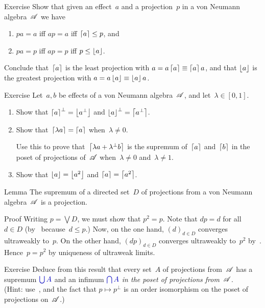 \documentclass[a]{subfiles}
\begin{document}
\begin{parsec}
\begin{point}{Exercise}%
Show that given an effect~$a$ and a projection~$p$
in a von Neumann algebra~$\mathscr{A}$ we have
\begin{enumerate}
\item
$pa=a$ iff $ap=a$ iff $\left\lceil a\right\rceil\leq p$, and
\item
$pa=p$ iff $ap=p$ iff $p\leq \left\lfloor a\right\rfloor$.
\end{enumerate}
Conclude that~$\left\lceil a\right\rceil$
is the least projection with $a=a\left\lceil a\right\rceil\equiv\left\lceil a\right\rceil a$,
and that $\left\lfloor a\right\rfloor$
is the greatest projection with $a=a\left\lfloor a\right\rfloor\equiv \left\lfloor a\right\rfloor a$.
\end{point}
\begin{point}{Exercise}%
Let~$a,b$ be effects of a von Neumann algebra~$\mathscr{A}$,
and let~$\lambda\in [0,1]$.
\begin{enumerate}
\item
Show that $\left\lceil a\right\rceil^\perp = \left\lfloor a^\perp\right\rfloor$
and $\left\lfloor a\right\rfloor^\perp = \left\lceil a^\perp\right\rceil$.
\item
Show that~$\left\lceil\lambda a\right\rceil = \left\lceil a\right\rceil$
when~$\lambda\neq 0$.

Use this to prove that~$\left\lceil\lambda a+\lambda^\perp b\right\rceil$
is the supremum of~$\left\lceil a\right\rceil$ and~$\left\lceil b\right\rceil$
in the poset of projections of~$\mathscr{A}$
when~$\lambda\neq 0$ and~$\lambda\neq 1$.
\item
Show that $\left\lfloor a\right\rfloor=\left\lfloor a^2\right\rfloor$
and $\left\lceil a\right\rceil=\left\lceil a^2\right\rceil$.
\end{enumerate}
\end{point}
\begin{point}{Lemma}%
The supremum of a directed set~$D$ of projections
from a von Neumann algebra~$\mathscr{A}$ is a projection.
\begin{point}{Proof}%
Writing $p=\bigvee D$,
we must show that $p^2=p$.
Note that $dp=d$ for all~$d\in D$
(by~ because~$d\leq p$.)
Now, on the one hand, $(d)_{d\in D}$
converges ultraweakly to~$p$.
On the other hand,
$(dp)_{d\in D}$
converges ultraweakly to~$p^2$ by~.
Hence~$p=p^2$ by uniqueness of ultraweak limits.
\end{point}
\end{point}
\begin{point}{Exercise}%
Deduce from this result
 that every set~$A$ of projections from~$\mathscr{A}$
has a supremum $\Define{\bigcup A}$
and an infimum $\Define{\bigcap A}$
\emph{in the poset of projections from~$\mathscr{A}$}.\\
(Hint: use~,
and the fact that $p\mapsto p^\perp$ 
is an order isomorphism on the poset of projections on~$\mathscr{A}$.)
\end{point}
\end{parsec}
\end{document}
